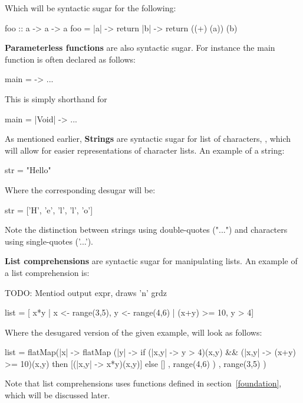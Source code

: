 Which will be syntactic sugar for the following:

\begin{kite}
foo :: a -> a -> a
foo = |a| -> {
  return |b| -> {
    return ((+) (a)) (b)
  }
}
\end{kite}

\textbf{Parameterless functions} are also syntactic sugar. For instance the main function is often declared as follows:

\begin{kite}
main = -> {
  ...
}
\end{kite}

This is simply shorthand for

\begin{kite}
main = |Void| -> {
  ...
}
\end{kite}

As mentioned earlier, \textbf{Strings} are syntactic sugar for list of characters, \code{[Char]}, which will allow for easier representations of character lists. An example of a string:

\begin{kite}
str = "Hello"
\end{kite}

Where the corresponding desugar will be:
\begin{kite}
str = ['H', 'e', 'l', 'l', 'o']
\end{kite}
Note the distinction between strings using double-quotes ("...") and characters using single-quotes ('...').

\label{sec:ex-listcomp}
\textbf{List comprehensions} are syntactic sugar for manipulating lists. An example of a list comprehension is:

TODO: Mentiod output expr, draws 'n' grdz

\begin{kite}
list = [ x*y | x <- range(3,5), y <- range(4,6) | (x+y) >= 10, y > 4]
\end{kite}

Where the desugared version of the given example, will look as follows:

\begin{kite}
list =
flatMap(|x| -> {
  flatMap (|y| -> {
    if (|x,y| -> {y > 4})(x,y) && (|x,y| -> {(x+y) >= 10})(x,y)
       then [(|x,y| -> {x*y})(x,y)]
       else []
  } , range(4,6) )
}, range(3,5) )
\end{kite}

Note that list comprehensions uses functions defined in section~\ref{foundation}, which will be discussed later.

